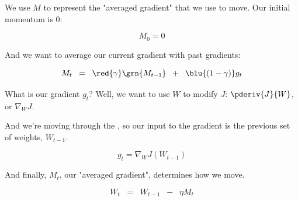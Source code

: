             We use $M$ to represent the "averaged gradient" that we use to move. Our initial momentum is 0:

            \begin{equation}
                M_0=0
            \end{equation}

            And we want to average our current gradient with past gradients:

            \begin{equation}
                M_t 
                \;\;=\;\;
                \red{\gamma} \grn{M_{t-1}}
                \;\;+\;\; 
                \blu{(1-\gamma)} g_{t}
            \end{equation}

            What is our  gradient $g_t$? Well, we want to use $W$ to modify $J$: $\pderiv{J}{W}$, or $\nabla_W J$.

            And we're moving through the , so our input to the gradient is the previous set of weights, $W_{t-1}$.

            \begin{equation}
                g_{t} = \nabla_W J (W_{t-1})
            \end{equation}

            And finally, $M_t$, our "averaged gradient", determines how we move.

            \begin{equation}
                W_t \;\;=\;\; W_{t-1} \;\;-\;\; \eta M_t
            \end{equation}

